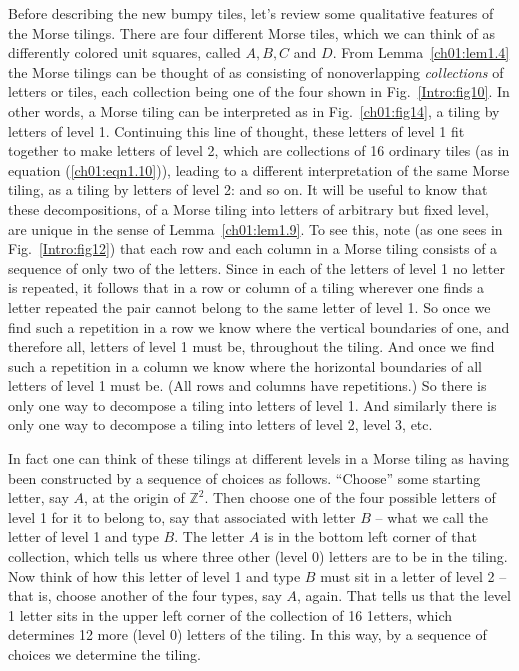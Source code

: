 \documentclass[reqno]{stml-l}
\theoremstyle{plain}
\theoremstyle{definition}
\numberwithin{equation}{chapter}
\begin{document}
Before describing the new bumpy tiles, let's review some
qualitative features of the Morse tilings. There are four
different Morse tiles, which we can think of as differently
colored unit squares, called $A,B,C$ and $D$. From
Lemma~\ref{ch01:lem1.4} the Morse tilings can be thought of
as consisting of nonoverlapping \emph{collections} of
letters or tiles, each collection being one of the four
shown in Fig.~\ref{Intro:fig10}. In other words, a Morse
tiling can be interpreted as in Fig.~\ref{ch01:fig14}, a
tiling by letters of level 1. Continuing this line of
thought, these letters of level 1 fit together to make
letters of level 2, which are collections of 16 ordinary
tiles (as in equation (\ref{ch01:eqn1.10})), leading to a
different interpretation of the same Morse tiling, as a
tiling by letters of level 2: and so on. It will be useful
to know that these decompositions, of a Morse tiling into
letters of arbitrary but fixed level, are unique in the
sense of Lemma~\ref{ch01:lem1.9}. To see this, note (as one
sees in Fig.~\ref{Intro:fig12}) that each row and each
column in a Morse tiling consists of a sequence of only two
of the letters. Since in each of the letters of level 1 no
letter is repeated, it follows that in a row or column of a
tiling wherever one finds a letter repeated the pair cannot
belong to the same letter of level 1. So once we find such
a repetition in a row we know where the vertical boundaries
of one, and therefore all, letters of level 1 must be,
throughout the tiling. And once we find such a repetition
in a column we know where the horizontal boundaries of all
letters of level 1 must be. (All rows and columns have
repetitions.) So there is only one way to decompose a
tiling into letters of level 1. And similarly there is only
one way to decompose a tiling into letters of level 2,
level 3, etc.

In fact one can think of these tilings at different levels in a Morse tiling as having been constructed by a sequence of choices as follows. ``Choose'' some starting letter, say $A$, at the origin of $\mathbb{Z}^{2}$. Then choose one of the four possible letters of level 1 for it to belong to, say that associated with letter $B$ -- what we call the letter of level 1 and type $B$. The letter $A$ is in the bottom left corner of that collection, which tells us where three other (level 0) letters are to be in the tiling. Now think of how this letter of level 1 and type $B$ must sit in a letter of level 2 -- that is, choose another of the four types, say $A$, again. That tells us that the level 1 letter sits in the upper left corner of the collection of 16 1etters, which determines 12 more (level 0) letters of the tiling. In this way, by a sequence of choices we determine the tiling.
\end{document}
